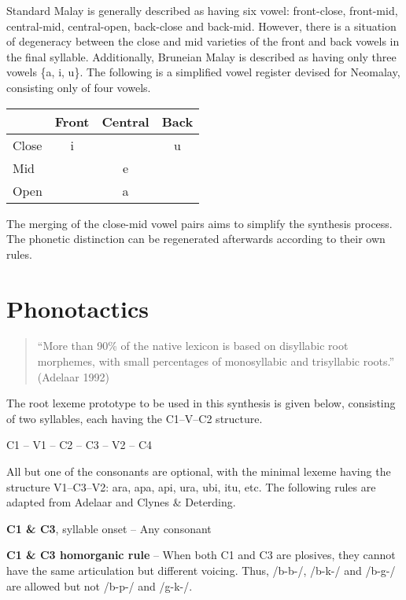 \documentclass{article}
\begin{document}
Standard Malay is generally described as having six vowel: front-close, front-mid, central-mid, central-open, back-close and back-mid. However, there is a situation of degeneracy between the close and mid varieties of the front and back vowels in the final syllable. Additionally, Bruneian Malay is described as having only three vowels \{a, i, u\}. The following is a simplified vowel register devised for Neomalay, consisting only of four vowels.

\begin{center}
	\begin{tabular}{l c c c}
		\toprule
		      & Front & Central & Back \\ \midrule
		Close & i     &         & u    \\
		Mid   &       & e       &      \\
		Open  &       & a       &      \\ \bottomrule
	\end{tabular}
\end{center} \bigskip

The merging of the close-mid vowel pairs aims to simplify the synthesis process. The phonetic distinction can be regenerated afterwards according to their own rules.

\pagebreak
\section{Phonotactics}

\begin{quote}
	``More than 90\% of the native lexicon is based on disyllabic root morphemes, with small percentages of monosyllabic and trisyllabic roots.'' (Adelaar 1992)
\end{quote}

The root lexeme prototype to be used in this synthesis is given below, consisting of two syllables, each having the C1--V--C2 structure.

\begin{center}
	C1 -- V1 -- C2 -- C3 -- V2 -- C4
\end{center}

All but one of the consonants are optional, with the minimal lexeme having the structure V1--C3--V2: ara, apa, api, ura, ubi, itu, etc. The following rules are adapted from Adelaar and Clynes \& Deterding.

\textbf{C1 \& C3}, syllable onset -- Any consonant

\textbf{C1 \& C3 homorganic rule} -- When both C1 and C3 are plosives, they cannot have the same articulation but different voicing. Thus, /b-b-/, /b-k-/ and /b-g-/ are allowed but not /b-p-/ and /g-k-/.
\end{document}
